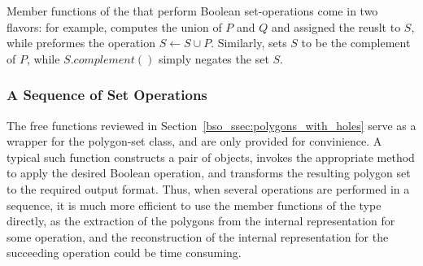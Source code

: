 Member functions of the  that perform
Boolean set-operations come in two flavors: for example, 
computes the union of $P$ and $Q$ and assigned the reuslt to $S$, while
 preformes the operation $S \longleftarrow S \cup P$.
Similarly,  sets $S$ to be the complement of $P$,
while $S.complement()$ simply negates the set $S$.

\subsubsection{A Sequence of Set Operations\label{bso_sssec:sequence}}

The free functions reviewed in Section~\ref{bso_ssec:polygons_with_holes}
serve as a wrapper for the polygon-set class, and are only provided for
convinience. A typical such function constructs a pair of
 objects, invokes the appropriate method to
apply the desired Boolean operation, and transforms the resulting
polygon set to the required output format. Thus, when several
operations are performed in a sequence, it is much more efficient to
use the member functions of the  type
directly, as the extraction of the polygons from the internal
representation for some operation, and the reconstruction of the
internal representation for the succeeding operation could be time
consuming.

